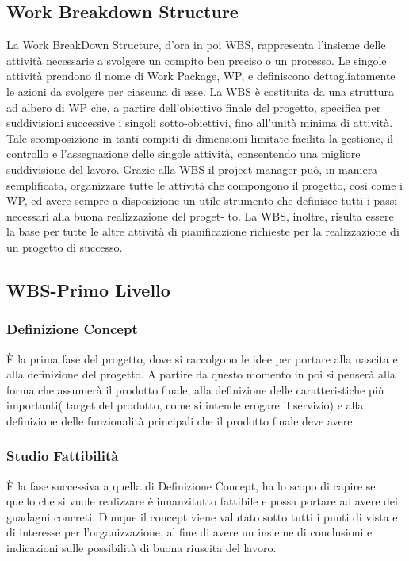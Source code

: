 \subsection{Work Breakdown Structure}

La Work BreakDown Structure, d’ora in poi WBS, rappresenta l’insieme delle attività
necessarie a svolgere un compito ben preciso o un processo. Le singole attività prendono
il nome di Work Package, WP, e definiscono dettagliatamente le azioni da svolgere per
ciascuna di esse.
La WBS è costituita da una struttura ad albero di WP che, a partire dell’obiettivo finale
del progetto, specifica per suddivisioni successive i singoli sotto-obiettivi, fino all’unità
minima di attività.
Tale scomposizione in tanti compiti di dimensioni limitate facilita la gestione, il controllo
e l’assegnazione delle singole attività, consentendo una migliore suddivisione del lavoro.
Grazie alla WBS il project manager può, in maniera semplificata, organizzare tutte le
attività che compongono il progetto, così come i WP, ed avere sempre a disposizione un
utile strumento che definisce tutti i passi necessari alla buona realizzazione del proget-
to. La WBS, inoltre, risulta essere la base per tutte le altre attività di pianificazione
richieste per la realizzazione di un progetto di successo.


\subsection{WBS-Primo Livello}
\subsubsection{Definizione Concept}

È la prima fase del progetto, dove si raccolgono le idee per portare alla nascita e alla definizione del progetto. A partire da questo momento in poi si penserà alla forma che assumerà il prodotto finale, alla  definizione delle caratteristiche più importanti( target del prodotto, come si intende erogare il servizio) e alla definizione delle funzionalità principali che il prodotto finale deve avere. 


 \subsubsection{Studio Fattibilità }

È la fase successiva a quella di Definizione Concept, ha lo scopo di capire se quello che si vuole realizzare è innanzitutto fattibile e possa portare ad avere dei guadagni concreti. Dunque il concept viene valutato sotto tutti i punti di vista e di interesse per l’organizzazione, al fine di avere un insieme di conclusioni e indicazioni sulle possibilità di buona riuscita del lavoro.

